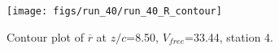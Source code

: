 \begin{figure}[H]
\centering
\texttt{[image: figs/run\_40/run\_40\_R\_contour]}
\caption{Contour plot of $\overline{r}$ at $z/c$=8.50, $V_{free}$=33.44, station 4.}
\label{fig:run_40_R_contour}
\end{figure}


